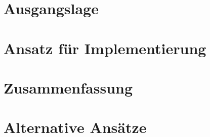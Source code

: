 
\chapter{Ausgangslage}

\chapter{Ansatz für Implementierung}

\chapter{Zusammenfassung}

\chapter{Alternative Ansätze}